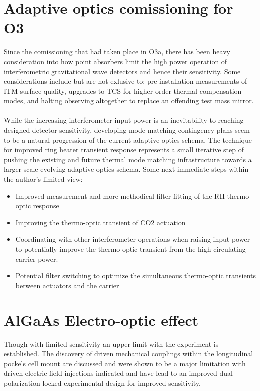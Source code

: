 
\section{Adaptive optics comissioning for O3}
Since the comissioning that had taken place in O3a, there has been heavy consideration into how point absorbers limit the high power operation of interferometric gravitational wave detectors and hence their sensitivity. Some considerations include but are not exlusive to: pre-installation measurements of ITM surface quality, upgrades to TCS for higher order thermal compensation modes, and halting observing altogether to replace an offending test mass mirror. 
\\
\\
While the increasing interferometer input power is an inevitability to reaching designed detector sensitivity, developing mode matching contingency plans seem to be a natural progression of the current adaptive optics schema. The technique for improved ring heater transient response represents a small iterative step of pushing the existing and future thermal mode matching infrastructure towards a larger scale evolving adaptive optics schema. Some next immediate steps within the author's limited view:

\begin{itemize}
	\item Improved measurement and more methodical filter fitting of the RH thermo-optic response
	\item Improving the thermo-optic transient of CO2 actuation
	\item Coordinating with other interferometer operations when raising input power to potentially improve the thermo-optic transient from the high circulating carrier power.
	\item Potential filter switching to optimize the simultaneous thermo-optic transients between actuators and the carrier 
\end{itemize}

\section{AlGaAs Electro-optic effect}
Though with limited sensitivity an upper limit with the experiment is established. The discovery of driven mechanical couplings within the longitudinal pockels cell mount are discussed and were shown to be a major limitation with driven electric field injections indicated and have lead to an improved dual-polarization locked experimental design for improved sensitivity.

